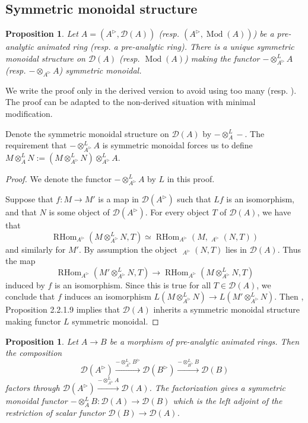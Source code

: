 \documentclass{article}
\theoremstyle{plain}
\newtheorem{prop}[thm]{Proposition}
\theoremstyle{definition}
\theoremstyle{remark}
\DeclareMathOperator{\rhom}{RHom}
\DeclareMathOperator{\rhoms}{\underline{RHom}}
\DeclareMathOperator{\modcat}{Mod}
\newcommand{\dten}{\otimes ^{L}}
\newcommand{\huflag}{\triangleright}
\newcommand{\D}{\mathcal{D}}
\newcommand{\resp}[1]{{\color{respcolor}(resp. #1)}}
\begin{document}
\subsection{Symmetric monoidal structure}
\begin{prop}
Let $ A = (A ^{\huflag}, \D (A)) $ \resp{$ (A ^{\huflag}, \modcat (A)) $} be a pre-analytic animated ring \resp{a pre-analytic ring}.
There is a unique symmetric monoidal structure on $ \D (A) $ \resp{$ \modcat (A) $} making the functor
$ -\dten _{A ^{\huflag}} A $ \resp{$ -\otimes _{A ^{\huflag}} A $} symmetric monoidal.
\end{prop}

We write the proof only in the derived version to avoid using too many \resp{}.
The proof can be adapted to the non-derived situation with minimal modification.

Denote the symmetric monoidal structure on $ \D (A) $ by $ -\dten _{A} - $.
The requirement that $ -\dten _{A ^{\huflag}} A $ is symmetric monoidal forces us to define
$ M \dten _{A} N := (M \dten _{A ^{\huflag}} N)\dten _{A ^{\huflag}} A $.

\begin{proof}
We denote the functor $ -\dten _{A ^{\huflag}} A $ by $ L $ in this proof.

Suppose that $ f: M\to M' $ is a map in $ \D (A ^{\huflag}) $
such that $ Lf $ is an isomorphism, and that $ N $ is some object of $ \D (A ^{\huflag}) $.
For every object $ T $ of $ \D (A) $, we have that
\begin{equation*}
\rhom _{A ^{\huflag}}(M \dten _{A ^{\huflag}} N, T) \simeq \rhom _{A ^{\huflag}}(M, \rhoms _{A ^{\huflag}}(N, T))
\end{equation*}
and similarly for $ M' $.
By assumption the object $ \rhoms _{A ^{\huflag}}(N, T) $ lies in $ \D (A) $.
Thus the map
\begin{equation*}
\rhom _{A ^{\huflag}}(M' \dten _{A ^{\huflag}} N, T) \to \rhom _{A ^{\huflag}}(M \dten _{A ^{\huflag}} N, T)
\end{equation*}
induced by $ f $ is an isomorphism.
Since this is true for all $ T\in \D (A) $, we conclude that $ f $ induces an isomorphism
$ L(M\dten _{A ^{\huflag}} N)\to L(M' \dten _{A ^{\huflag}} N) $.
Then \cite{ha}, Proposition 2.2.1.9 implies that $ \D (A) $ inherits a symmetric monoidal structure making functor $ L $ symmetric monoidal.
\end{proof}

\begin{prop}
Let $ A\to B $ be a morphism of pre-analytic animated rings. Then the composition
\begin{equation*}
\D (A ^{\huflag}) \xrightarrow{- \dten _{A ^{\huflag}} B ^{\huflag}} \D (B ^{\huflag}) \xrightarrow{-\dten _{B ^{\huflag}} B} \D (B)
\end{equation*}
factors through $ \D (A ^{\huflag}) \xrightarrow{-\dten _{A ^{\huflag}} A}\D (A) $.
The factorization gives a symmetric monoidal functor $ -\dten _{A} B: \D (A)\to \D (B) $
which is the left adjoint of the restriction of scalar functor $ \D (B)\to \D (A) $.
\end{prop}
\end{document}
